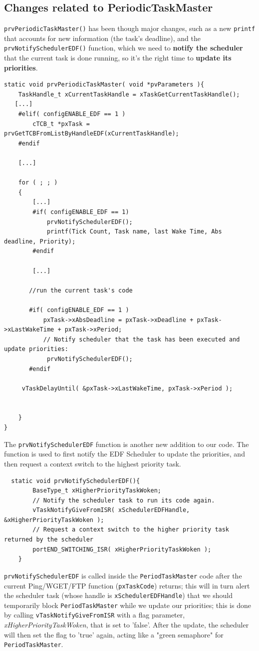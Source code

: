 \documentclass[10pt]{article}
\begin{document}
\subsection{Changes related to PeriodicTaskMaster}
\verb|prvPeriodicTaskMaster()| has been though major changes, such as a new \verb|printf| that accounts for new information (the task's deadline), and the \verb|prvNotifySchedulerEDF()| function, which we need to \textbf{notify the scheduler} that the current task is done running, so it's the right time to \textbf{update its priorities}.

\lstset{language=c}
\begin{lstlisting}
static void prvPeriodicTaskMaster( void *pvParameters ){
    TaskHandle_t xCurrentTaskHandle = xTaskGetCurrentTaskHandle();
   [...]
    #elif( configENABLE_EDF == 1 )
        cTCB_t *pxTask = prvGetTCBFromListByHandleEDF(xCurrentTaskHandle);
    #endif

    [...]

    for ( ; ; )
    {
        [...]
        #if( configENABLE_EDF == 1)
            prvNotifySchedulerEDF();
            printf(Tick Count, Task name, last Wake Time, Abs deadline, Priority);
        #endif
        
        [...]
        
       //run the current task's code

       #if( configENABLE_EDF == 1 )
           pxTask->xAbsDeadline = pxTask->xDeadline + pxTask->xLastWakeTime + pxTask->xPeriod;
           // Notify scheduler that the task has been executed and update priorities:
            prvNotifySchedulerEDF();
       #endif
       
     vTaskDelayUntil( &pxTask->xLastWakeTime, pxTask->xPeriod );


    }
}
\end{lstlisting}
The \verb|prvNotifySchedulerEDF| function is another new addition to our code. The function is used to first notify the EDF Scheduler to update the priorities, and then request a context switch to the highest priority task. 

\lstset{language=c}
\begin{lstlisting}
  static void prvNotifySchedulerEDF(){
        BaseType_t xHigherPriorityTaskWoken;
        // Notify the scheduler task to run its code again. 
        vTaskNotifyGiveFromISR( xSchedulerEDFHandle, &xHigherPriorityTaskWoken );
        // Request a context switch to the higher priority task returned by the scheduler
        portEND_SWITCHING_ISR( xHigherPriorityTaskWoken );
    }
\end{lstlisting}
\verb|prvNotifySchedulerEDF| is called inside the \verb|PeriodTaskMaster| code after the current Ping/WGET/FTP function (\verb|pxTaskCode|) returns; this will in turn alert the scheduler task (whose handle is \verb|xSchedulerEDFHandle|) that we should temporarily block \verb|PeriodTaskMaster| while we update our priorities; this is done by calling \verb|vTaskNotifyGiveFromISR| with a flag parameter, \textit{xHigherPriorityTaskWoken}, that is set to 'false'.
After the update, the scheduler will then set the flag to 'true' again, acting like a "green semaphore" for \verb|PeriodTaskMaster|.
\end{document}

